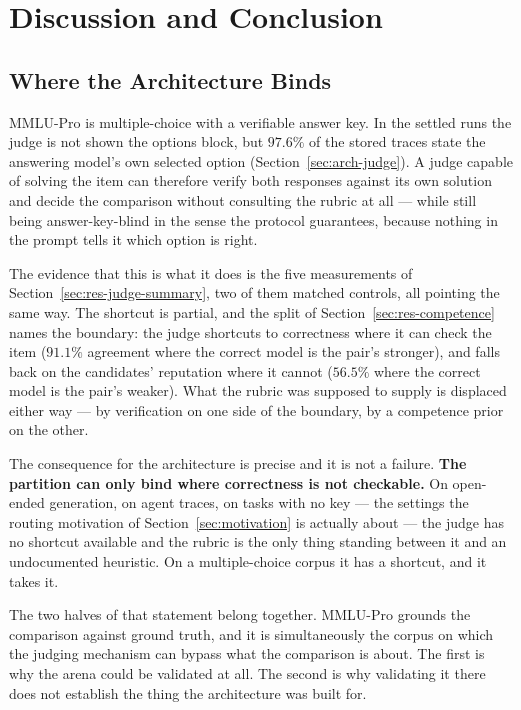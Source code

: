 \chapter{Discussion and Conclusion}\label{ch:discussion}

\section{Where the Architecture Binds}\label{sec:disc-rq1}

MMLU-Pro is multiple-choice with a verifiable answer key. In the settled
runs the judge is not shown the options block, but $97.6\%$ of the stored
traces state the answering model's own selected option
(Section~\ref{sec:arch-judge}). A judge capable of
solving the item can therefore verify both responses against its own
solution and decide the comparison without consulting the rubric at
all --- while still being answer-key-blind in the sense the protocol
guarantees, because nothing in the prompt tells it which option is
right.

The evidence that this is what it does is the five measurements of
Section~\ref{sec:res-judge-summary}, two of them matched controls, all
pointing the same way. The shortcut is partial, and the split of
Section~\ref{sec:res-competence} names the boundary: the judge
shortcuts to correctness where it can check the item ($91.1\%$
agreement where the correct model is the pair's stronger), and falls
back on the candidates' reputation where it cannot ($56.5\%$ where the
correct model is the pair's weaker). What the rubric was supposed to
supply is displaced either way --- by verification on one side of the
boundary, by a competence prior on the other.

The consequence for the architecture is precise and it is not a
failure. \textbf{The partition can only bind where correctness is not
checkable.} On open-ended generation, on agent traces, on tasks with no
key --- the settings the routing motivation of
Section~\ref{sec:motivation} is actually about --- the judge has no
shortcut available and the rubric is the only thing standing between it
and an undocumented heuristic. On a multiple-choice corpus it has a
shortcut, and it takes it.

The two halves of that statement belong together. MMLU-Pro grounds the
comparison against ground truth, and it is simultaneously the corpus on
which the judging mechanism can bypass what the comparison is about.
The first is why the arena could be validated at all. The second is why
validating it there does not establish the thing the architecture was
built for.


